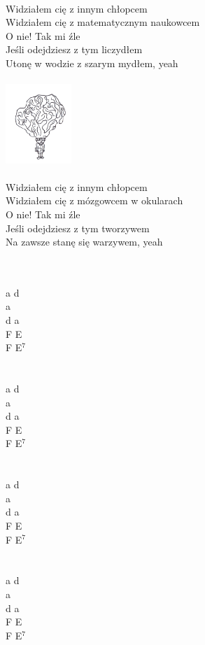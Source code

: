 \documentclass[a5paper, 10pt]{book}
\begin{document}
\begin{minipage}[t]{0.9\textwidth}
  \\
  Widziałem cię z innym chłopcem\\
  Widziałem cię z matematycznym naukowcem\\
  O nie! Tak mi źle\\
  Jeśli odejdziesz z tym liczydłem\\
  Utonę w wodzie z szarym mydłem, yeah\\
  \\
  \includegraphics[height=3cm, right]{widzialem_cie_4.png}\vspace*{-3.1cm}\\
  \\
  Widziałem cię z innym chłopcem\\
  Widziałem cię z mózgowcem w okularach\\
  O nie! Tak mi źle\\
  Jeśli odejdziesz z tym tworzywem\\
  Na zawsze stanę się warzywem, yeah\\
\end{minipage}
\begin{minipage}[t]{0.1\textwidth}
  ~\\
  \\
  a d\\
  a\\
  d a\\
  F E\\
  F E$^7$\\
  \\
  \\
  a d\\
  a\\
  d a\\
  F E\\
  F E$^7$\\
  \\
  \\
  a d\\
  a\\
  d a\\
  F E\\
  F E$^7$\\
  \\
  \\
  a d\\
  a\\
  d a\\
  F E\\
  F E$^7$\\
\end{minipage}
\end{document}
